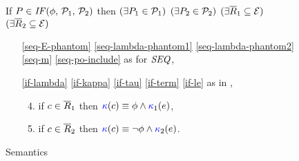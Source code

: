 \begin{figure}
  \noindent
  If $\aPS \in \sIF{\aForm}\sTHEN\aPSS_1\sELSE\aPSS_2\sFI$ then
  $(\exists P_1\in\mathcal{P}_1)$ $(\exists P_2\in\mathcal{P}_2)$
  $(\exists\overline{R}_1\subseteq\mathcal{E})$ $(\exists\overline{R}_2\subseteq\mathcal{E})$
  \begin{multicols}{2}
    \begin{enumerate}[topsep=0pt,label=(\textsc{i}\arabic*),ref=\textsc{i}\arabic*]

    \item[\eqref{seq-E-phantom}]
      \eqref{seq-lambda-phantom1}\;
      \eqref{seq-lambda-phantom2}\;
      \eqref{seq-m}\;
      \eqref{seq-po-include}\;
      as for $\sSEMI{}{}$,

    \item[\eqref{if-lambda}]
      \eqref{if-kappa}\;
      \eqref{if-tau}\;
      \eqref{if-term}\; 
      \eqref{if-le}\;
      as in ,

      \setcounter{enumi}{\value{kappa}}
    \item[] 
      \begin{enumerate}[leftmargin=0pt]
        \setcounter{enumii}{3}
      \item \label{if-kappa-phantom1}
        if $c\in \overline{R}_1$ then ${\color{blue}\kappa}(c) \mathrel{\equiv} \phi\land{\color{blue}\kappa}_1(e)$,
      \item \label{if-kappa-phantom2} 
        if $c\in \overline{R}_2$ then ${\color{blue}\kappa}(c) \mathrel{\equiv} \lnot\phi\land{\color{blue}\kappa}_2(e)$.
      \end{enumerate}      
    \end{enumerate}
  \end{multicols}
  \medskip

  \caption{\PwTcTITLE{} Semantics}
  \label{fig:c11}
\end{figure}
